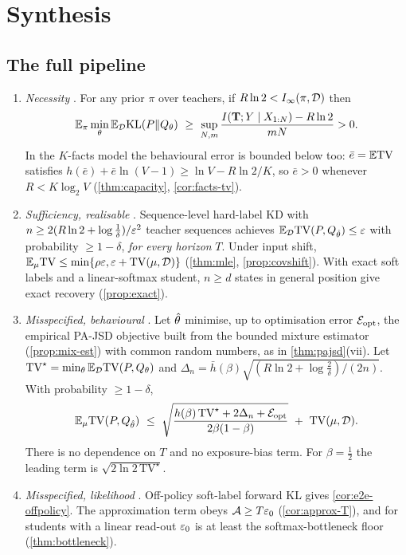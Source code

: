 \section{Synthesis}\label{sec:synthesis}

\subsection{The full pipeline}

\begin{theorem}\label{thm:sandwich}
\begin{enumerate}[label=(\roman*),leftmargin=*]
\item \emph{Necessity} . For any prior $\pi$ over teachers, if $R\ln2<I_\infty(\pi,\mathcal{D})$ then
\[
\E_\pi\min_\theta\E_\cD\KL(P\|Q_\theta)\ \ge\ \sup_{N,m}\frac{I(\mathbf T;Y\mid X_{1:N})-R\ln2}{mN}>0 .
\]
In the $K$-facts model the behavioural error is bounded below too: $\bar e=\mathbb{E}\mathrm{TV}$ satisfies
$h(\bar e)+\bar e\ln(V-1)\ge\ln V-R\ln2/K$, so $\bar e>0$ whenever $R<K\log_2V$ (\cref{thm:capacity}, \cref{cor:facts-tv}).
\item \emph{Sufficiency, realisable} . Sequence-level hard-label KD with
$n\ge2(R\ln2+\log\frac1\delta)/\varepsilon^2$ teacher sequences achieves $\mathbb{E}_{\mathcal{D}}\mathrm{TV}(P,Q_{\hat\theta})\le\varepsilon$ with
probability $\ge1-\delta$, \emph{for every horizon} $T$. Under input shift, $\mathbb{E}_\mu\mathrm{TV}\le\min\{\rho\varepsilon,\varepsilon+\mathrm{TV}(\mu,\mathcal{D})\}$
(\cref{thm:mle}, \cref{prop:covshift}). With exact soft labels and a linear-softmax student, $n\ge d$ states
in general position give exact recovery (\cref{prop:exact}).
\item \emph{Misspecified, behavioural} . Let $\hat\theta$ minimise, up to optimisation error
$\mathcal{E}_{\mathrm{opt}}$, the empirical PA-JSD objective built from the bounded mixture estimator (\cref{prop:mix-est}) with
common random numbers, as in \cref{thm:pajsd}(vii). Let $\mathrm{TV}^\star=\min_\theta\mathbb{E}_{\mathcal{D}}\mathrm{TV}(P,Q_\theta)$ and
$\Delta_n=\bar h(\beta)\sqrt{(R\ln2+\log\frac2\delta)/(2n)}$. With probability $\ge1-\delta$,
\[
\E_\mu\TV(P,Q_{\htheta})\ \le\ \sqrt{\frac{h(\beta)\,\mathrm{TV}^\star+2\Delta_n+\cE_{\mathrm{opt}}}{2\beta(1-\beta)}}\ +\ \TV(\mu,\cD).
\]
There is no dependence on $T$ and no exposure-bias term. For $\beta=\frac12$ the leading term is
$\sqrt{2\ln2\,\mathrm{TV}^\star}$.
\item \emph{Misspecified, likelihood} . Off-policy soft-label forward KL gives
\cref{cor:e2e-offpolicy}. The approximation term obeys $\mathcal{A}\ge T\varepsilon_0$ (\cref{cor:approx-T}), and for students
with a linear read-out $\varepsilon_0$ is at least the softmax-bottleneck floor (\cref{thm:bottleneck}).
\end{enumerate}
\end{theorem}
